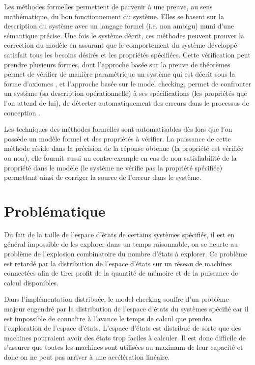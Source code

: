 Les méthodes formelles permettent de parvenir à une preuve, au sens mathématique, du bon fonctionnement du système. Elles se basent sur la description du système avec un langage formel (i.e. non ambigu) muni d’une sémantique précise. Une fois le système décrit, ces méthodes peuvent prouver la correction du modèle en assurant que le comportement du système développé satisfait tous les besoins désirés et les propriétés spécifiées. Cette vérification peut prendre plusieurs formes, dont l’approche basée sur la preuve de théorèmes permet de vérifier de manière paramétrique un système qui est décrit sous la forme d’axiomes \citep{Rushby2001}, et l’approche basée sur le model checking, permet de confronter un système (sa description opérationnelle) à ses spécifications (les propriétés que l’on attend de lui), de détecter automatiquement des erreurs dans le processus de conception \citep{Clarke1999}.

Les techniques des méthodes formelles sont automatisables dès lors que l’on possède un modèle formel et des propriétés à vérifier. La puissance de cette méthode réside dans la précision de la réponse obtenue (la propriété est vérifiée ou non), elle fournit aussi un contre-exemple en cas de non satisfiabilité de la propriété dans le modèle (le système ne vérifie pas la propriété spécifiée) permettant ainsi de corriger la source de l'erreur dans le système.

\section*{Problématique}
Du fait de la taille de l'espace d'états de certains systèmes spécifiés, il est en général impossible de les explorer dans un temps raisonnable, on se heurte au problème de l'explosion combinatoire du nombre d'états à explorer. Ce problème est retardé par la distribution de l'espace d'états sur un réseau de machines connectées afin de tirer profit de la quantité de mémoire et de la puissance de calcul disponibles.

Dans l’implémentation distribuée, le model checking souffre d'un problème majeur engendré par la distribution de l'espace d'états du systèmes spécifié car il est impossible de connaître à l’avance le temps de calcul que prendra l’exploration de l'espace d'états. L'espace d'états est distribué de sorte que des machines pourraient avoir des états trop faciles à calculer. Il est donc difficile de s’assurer que toutes les machines sont utilisées au maximum de leur capacité et donc on ne peut pas arriver à une accélération linéaire.

